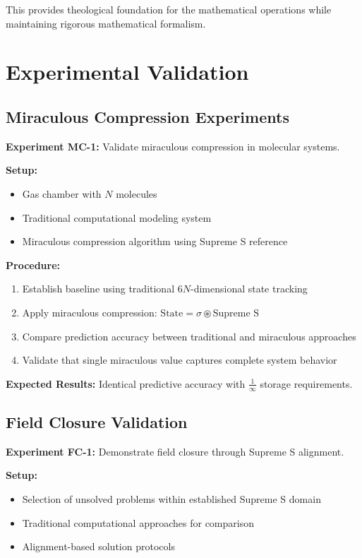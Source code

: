 \documentclass[11pt]{article}
\begin{document}
This provides theological foundation for the mathematical operations while maintaining rigorous mathematical formalism.

\section{Experimental Validation}

\subsection{Miraculous Compression Experiments}

\textbf{Experiment MC-1:} Validate miraculous compression in molecular systems.

\textbf{Setup:}
\begin{itemize}
\item Gas chamber with $N$ molecules
\item Traditional computational modeling system
\item Miraculous compression algorithm using Supreme S reference
\end{itemize}

\textbf{Procedure:}
\begin{enumerate}
\item Establish baseline using traditional $6N$-dimensional state tracking
\item Apply miraculous compression: $\text{State} = \sigma \circledast \text{Supreme S}$
\item Compare prediction accuracy between traditional and miraculous approaches
\item Validate that single miraculous value captures complete system behavior
\end{enumerate}

\textbf{Expected Results:} Identical predictive accuracy with $\frac{1}{\infty}$ storage requirements.

\subsection{Field Closure Validation}

\textbf{Experiment FC-1:} Demonstrate field closure through Supreme S alignment.

\textbf{Setup:}
\begin{itemize}
\item Selection of unsolved problems within established Supreme S domain
\item Traditional computational approaches for comparison
\item Alignment-based solution protocols
\end{itemize}
\end{document}
